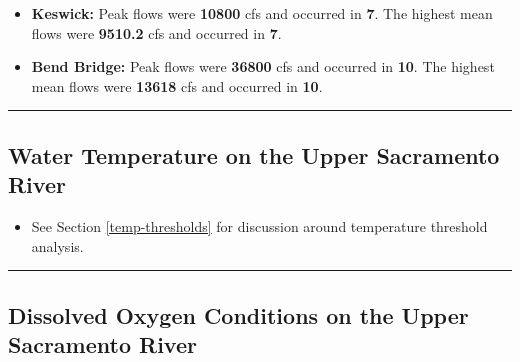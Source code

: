 \documentclass[
]{book}
\providecommand{\tightlist}{%
  \setlength{\itemsep}{0pt}\setlength{\parskip}{0pt}}
\theoremstyle{definition}
\theoremstyle{definition}
\theoremstyle{definition}
\theoremstyle{definition}
\theoremstyle{remark}
\begin{document}
\begin{itemize}
\tightlist
\item
  \textbf{Keswick:} Peak flows were \textbf{10800} cfs and occurred in \textbf{7}. The highest mean flows were \textbf{9510.2} cfs and occurred in \textbf{7}.
\item
  \textbf{Bend Bridge:} Peak flows were \textbf{36800} cfs and occurred in \textbf{10}. The highest mean flows were \textbf{13618} cfs and occurred in \textbf{10}.
\end{itemize}

\begin{center}\rule{0.5\linewidth}{0.5pt}\end{center}

\hypertarget{water-temperature-on-the-upper-sacramento-river}{%
\subsection{Water Temperature on the Upper Sacramento River}\label{water-temperature-on-the-upper-sacramento-river}}

\begin{itemize}
\tightlist
\item
  See Section \ref{temp-thresholds} for discussion around temperature threshold analysis.
\end{itemize}

\begin{center}\rule{0.5\linewidth}{0.5pt}\end{center}

\hypertarget{dissolved-oxygen-conditions-on-the-upper-sacramento-river}{%
\subsection{Dissolved Oxygen Conditions on the Upper Sacramento River}\label{dissolved-oxygen-conditions-on-the-upper-sacramento-river}}
\end{document}
